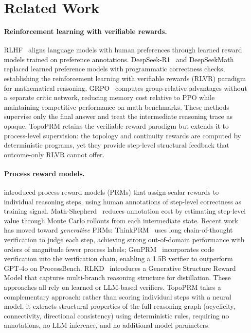 \section{Related Work}
\label{sec:related_work}

\paragraph{Reinforcement learning with verifiable rewards.}
RLHF~\citep{ouyang2022training} aligns language models with human
preferences through learned reward models trained on preference
annotations. DeepSeek-R1~\citep{deepseekr1} and
DeepSeekMath~\citep{shao2024deepseekmath} replaced learned preference
models with programmatic correctness checks, establishing the
reinforcement learning with verifiable rewards (RLVR) paradigm for
mathematical reasoning. GRPO~\citep{shao2024deepseekmath} computes
group-relative advantages without a separate critic network, reducing
memory cost relative to PPO while maintaining competitive performance on
math benchmarks. These methods supervise only the final answer and treat
the intermediate reasoning trace as opaque. TopoPRM retains the
verifiable reward paradigm but extends it to process-level supervision:
the topology and continuity rewards are computed by deterministic
programs, yet they provide step-level structural feedback that
outcome-only RLVR cannot offer.

\paragraph{Process reward models.}
\citet{lightman2023lets} introduced process reward models (PRMs) that
assign scalar rewards to individual reasoning steps, using human
annotations of step-level correctness as training signal.
Math-Shepherd~\citep{wang2024math} reduces annotation cost by estimating
step-level value through Monte Carlo rollouts from each intermediate
state. Recent work has moved toward \emph{generative} PRMs:
ThinkPRM~\citep{thinkprm2025} uses long chain-of-thought verification
to judge each step, achieving strong out-of-domain performance with
orders of magnitude fewer process labels;
GenPRM~\citep{genprm2026} incorporates code verification into the
verification chain, enabling a 1.5B verifier to outperform GPT-4o on
ProcessBench.
RLKD~\citep{rlkd2025} introduces a Generative Structure Reward Model
that captures multi-branch reasoning structure for distillation.
These approaches all rely on learned or LLM-based verifiers.
TopoPRM takes a complementary approach: rather than
scoring individual steps with a neural model, it extracts structural
properties of the full reasoning graph (acyclicity, connectivity,
directional consistency) using deterministic rules, requiring no
annotations, no LLM inference, and no additional model parameters.

